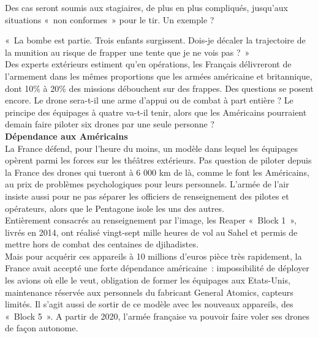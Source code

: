 \documentclass[8pt]{article}
\begin{document}
Des cas seront soumis aux stagiaires, de plus en plus compliqués, jusqu’aux situations «~non conformes~» pour le tir. Un exemple ?

«~La bombe est partie. Trois enfants surgissent. Dois-je décaler la trajectoire de la munition au risque de frapper une tente que je ne vois pas ?~»\\

Des experts extérieurs estiment qu’en opérations, les Français délivreront de l’armement dans les mêmes proportions que les armées américaine et britannique, dont 10\% à 20\% des missions débouchent sur des frappes. Des questions se posent encore. Le drone sera-t-il une arme d’appui ou de combat à part entière ? Le principe des équipages à quatre va-t-il tenir, alors que les Américains pourraient demain faire piloter six drones par une seule personne ?\\

\textbf{Dépendance aux Américains}\\

La France défend, pour l’heure du moins, un modèle dans lequel les équipages opèrent parmi les forces sur les théâtres extérieurs. Pas question de piloter depuis la France des drones qui tueront à 6 000 km de là, comme le font les Américains, au prix de problèmes psychologiques pour leurs personnels. L’armée de l’air insiste aussi pour ne pas séparer les officiers de renseignement des pilotes et opérateurs, alors que le Pentagone isole les uns des autres.\\

Entièrement consacrés au renseignement par l’image, les Reaper «~Block 1~», livrés en 2014, ont réalisé vingt-sept mille heures de vol au Sahel et permis de mettre hors de combat des centaines de djihadistes.\\

Mais pour acquérir ces appareils à 10 millions d’euros pièce très rapidement, la France avait accepté une forte dépendance américaine~: impossibilité de déployer les avions où elle le veut, obligation de former les équipages aux Etats-Unis, maintenance réservée aux personnels du fabricant General Atomics, capteurs limités. Il s’agit aussi de sortir de ce modèle avec les nouveaux appareils, des «~Block 5~». A partir de 2020, l’armée française va pouvoir faire voler ses drones de façon autonome.\\
\end{document}
